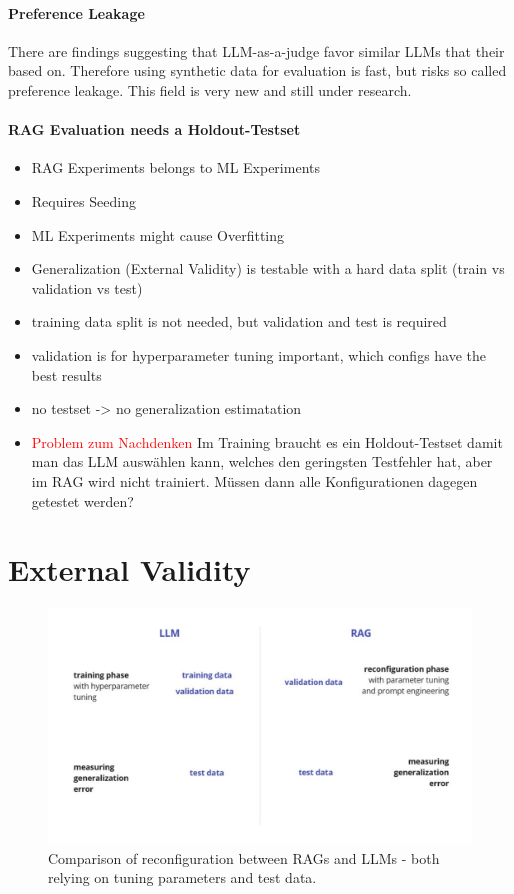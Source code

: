 \paragraph{Preference Leakage}
There are findings suggesting that LLM-as-a-judge favor similar LLMs that their based on. Therefore using synthetic data for evaluation is fast, but risks so called preference leakage.\cite{Li.03.02.2025} This field is very new and still under research. 


\paragraph{RAG Evaluation needs a Holdout-Testset}
\begin{itemize}
    \item RAG Experiments belongs to ML Experiments 
    \item Requires Seeding
    \item ML Experiments might cause Overfitting
    \item Generalization (External Validity) is testable with a hard data split (train vs validation vs test)
    \item training data split is not needed, but validation and test is required
    \item validation is for hyperparameter tuning important, which configs have the best results
    \item no testset -> no generalization estimatation
    \item \textcolor{red}{Problem zum Nachdenken} Im Training braucht es ein Holdout-Testset damit man das LLM auswählen kann, welches den geringsten Testfehler hat, aber im RAG wird nicht trainiert. Müssen dann alle Konfigurationen dagegen getestet werden?
\end{itemize}

\section{External Validity}

\begin{figure}
    \centering
    \includegraphics[width=\textwidth]{images/RAGvsLLM-tuning.pdf}
    \caption{Comparison of reconfiguration between RAGs and LLMs - both relying on tuning parameters and test data.}
    \label{fig:tuning}
\end{figure}

